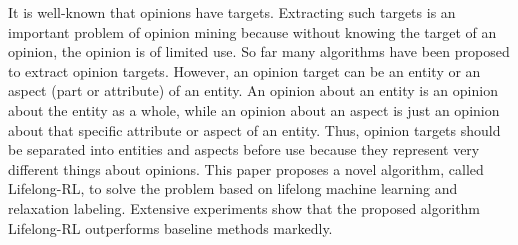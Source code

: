 It is well-known that opinions have targets. Extracting such targets is an important problem of opinion mining because without knowing the target of an opinion, the opinion is of limited use. So far many algorithms have been proposed to extract opinion targets. However, an opinion target can be an entity or an aspect (part or attribute) of an entity. An opinion about an entity is an opinion about the entity as a whole, while an opinion about an aspect is just an opinion about that specific attribute or aspect of an entity. Thus, opinion targets should be separated into entities and aspects before use because they represent very different things about opinions. This paper proposes a novel algorithm, called Lifelong-RL, to solve the problem based on lifelong machine learning and relaxation labeling. Extensive experiments show that the proposed algorithm Lifelong-RL outperforms baseline methods markedly.
